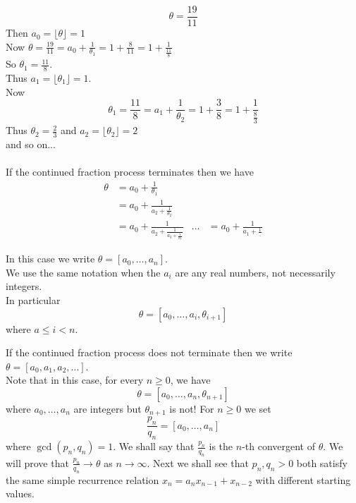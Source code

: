 \documentclass[NumTh.tex]{subfiles}
\begin{document}
\begin{ex*}
  \[\theta = \frac{19}{11}\]
  Then $a_0 = \lfloor \theta \rfloor = 1$\\
  Now $\theta = \frac{19}{11} = a_0 + \frac{1}{\theta_1} = 1 + \frac{8}{11} = 1 + \frac{1}{\frac{11}{8}}$\\
  So $\theta_1 = \frac{11}{8}$.\\
  Thus $a_1 = \lfloor \theta_1 \rfloor = 1$.\\
  Now 
  \[ \theta_1 = \frac{11}{8} = a_1 + \frac{1}{\theta_2} = 1 + \frac{3}{8} = 1 + \frac{1}{\frac{8}{3}} \]
  Thus $\theta_2 = \frac{2}{3}$ and $a_2 = \lfloor \theta_2 \rfloor = 2$\\
  and so on...\\
  \\
  If the continued fraction process terminates then we have
  \begin{align}
  \theta &= a_0 + \frac{1}{\theta_1}\\
  &= a_0 + \frac{1}{a_2 + \frac{1}{\theta_2}}\\
  &= a_0 + \frac{1}{a_2 + \frac{1}{a_3 + \frac{1}{\theta_3}}}
  & \dots
  &= a_0 + \frac{1}{a_1 + \frac{1}{..}}%
  \end{align}
  
  In this case we write $\theta = [a_0,\dots,a_n]$.\\
  We use the same notation when the $a_i$ are any real numbers, not necessarily integers.\\
  In particular
  \[ \theta = [a_0,\dots,a_i,\theta_{i+1}] \]
  where $a \leq i < n$.
\end{ex*}

If the continued fraction process does not terminate then we write $\theta = [a_0,a_1,a_2,\dots]$.\\
Note that in this case, for every $n \geq 0$, we have 
\[ \theta = [a_0,\dots, a_n,\theta_{n+1}] \]
where $a_0,\dots,a_n$ are integers but $\theta_{n+1}$ is not!
For $n \geq 0$ we set 
\[ \frac{p_n}{q_n} = [a_0,\dots,a_n] \] 
where $\gcd(p_n,q_n) = 1$.
We shall say that $\frac{p_n}{q_n}$ is the $n$-th convergent of $\theta$.
We will prove that $\frac{p_n}{q_n} \to \theta$ as $n \to \infty$.
Next we shall see that  $p_n,q_n > 0$ both satisfy the same simple recurrence relation $x_n = a_n x_{n-1} + x_{n-2}$ with different starting values.
\end{document}
